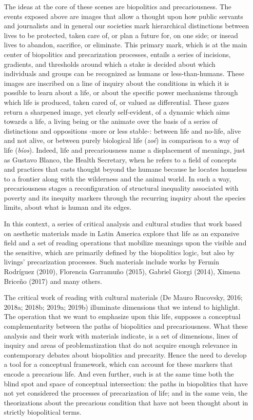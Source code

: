\documentclass[a4paper,]{scrartcl}
\begin{document}
The ideas at the core of these scenes are biopolitics and
precariousness. The events exposed above are images that allow a thought
upon how public servants and journalists and in general our societies
mark hierarchical distinctions between lives to be protected, taken care
of, or plan a future for, on one side; or insead lives to abandon,
sacrifice, or eliminate. This primary mark, which is at the main center
of biopolitics and precarization processes, entails a series of
incisions, gradients, and thresholds around which a stake is decided
about which individuals and groups can be recognized as humans or
less-than-humans. These images are inscribed on a line of inquiry about
the conditions in which it is possible to learn about a life, or about
the specific power mechanisms through which life is produced, taken
cared of, or valued as differential. These gazes return a sharpened
image, yet clearly self-evident, of a dynamic which aims towards a life,
a living being or the animate over the basis of a series of distinctions
and oppositions -more or less stable-: between life and no-life, alive
and not alive, or between purely biological life (\emph{zoé}) in
comparison to a way of life (\emph{bíos}). Indeed, life and
precariousness name a displacement of meanings, just as Gustavo Blanco,
the Health Secretary, when he refers to a field of concepts and
practices that casts thought beyond the humane because he locates
homeless to a frontier along with the wilderness and the animal world.
In such a way, precariousness stages a reconfiguration of structural
inequality associated with poverty and its inequity markers through the
recurring inquiry about the species limits, about what is human and its
edges.

In this context, a series of critical analysis and cultural studies that
work based on aesthetic materials made in Latin America explore that
life as an expansive field and a set of reading operations that mobilize
meanings upon the visible and the sensitive, which are primarily defined
by the biopolitics logic, but also by livings' precarization processes.
Such materials include works by Fermín Rodríguez (2010), Florencia
Garramuño (2015), Gabriel Giorgi (2014), Ximena Briceño (2017) and many
others.

The critical work of reading with cultural materials (De Mauro Rucovsky,
2016; 2018a; 2018b; 2019a; 2019b) illuminate dimensions that we intend
to highlight. The operation that we want to emphasize upon this life,
supposes a conceptual complementarity between the paths of biopolitics
and precariousness. What these analysis and their work with materials
indicate, is a set of dimensions, lines of inquiry and areas of
problematization that do not acquire enough relevance in contemporary
debates about biopolitics and precarity. Hence the need to develop a
tool for a conceptual framework, which can account for these markers
that encode a precarious life. And even further, such is at the same
time both the blind spot and space of conceptual intersection: the paths
in biopolitics that have not yet considered the processes of
precarization of life; and in the same vein, the theorizations about the
precarious condition that have not been thought about in strictly
biopolitical terms.
\end{document}
